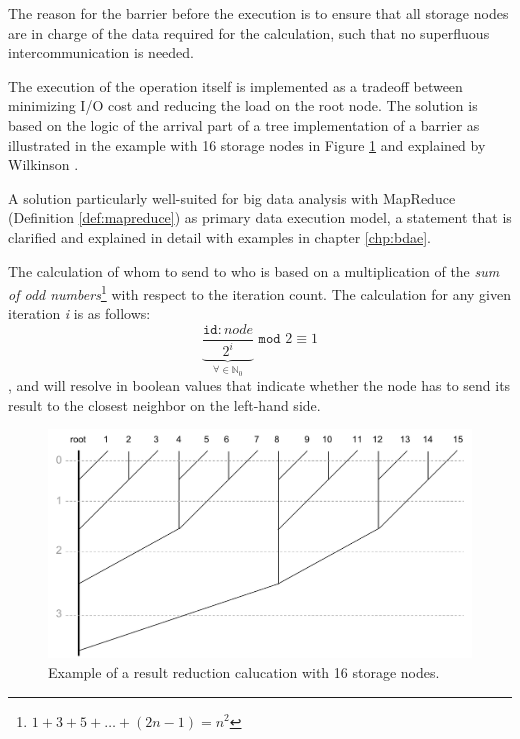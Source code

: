 \newpage
\noindent
The reason for the barrier before the execution is to ensure that all storage nodes are in charge of the data required for the calculation, such that no superfluous intercommunication is needed.
\newline

The execution of the operation itself is implemented as a tradeoff between minimizing I/O cost and reducing the load on the root node. The solution is based on the logic of the arrival part of a tree implementation of a barrier as illustrated in the example with 16 storage nodes in Figure \ref{fig:reduction-tree} and explained by Wilkinson \etal \cite{Wilkinson:1998:PPT:289352}.

A solution particularly well-suited for big data analysis with MapReduce (Definition \ref{def:mapreduce}) as primary data execution model, a statement that is clarified and explained in detail with examples in chapter \ref{chp:bdae}.
\newline

The calculation of whom to send to who is based on a multiplication of the \textit{sum of odd numbers}\footnote{$1 + 3 + 5 + \ldots + (2n-1) = n^2$} with respect to the iteration count. The calculation for any given iteration \textit{i} is as follows:
\begin{equation} \label{eq:reduction}
\underbrace{\dfrac{\texttt{id}:node}{2^{i}}}_{\forall \in \mathbb{N}_0} \texttt{ mod } 2 \equiv 1
\end{equation}
, and will resolve in boolean values that indicate whether the node has to send its result to the closest neighbor on the left-hand side.
\newline

\begin{figure}
	\centering
	\includegraphics[scale=0.5]{pdf/reduction-tree.pdf}
	\caption[Result reduction calucation example]{Example of a result reduction calucation with 16 storage nodes. \label{fig:reduction-tree}}
\end{figure}	

